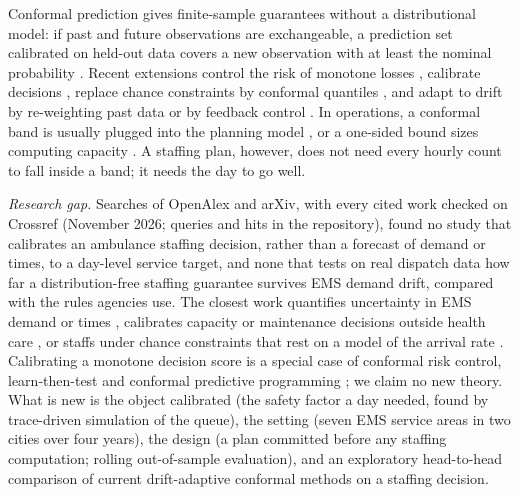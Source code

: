 \documentclass[11pt]{article}
\begin{document}
Conformal prediction gives finite-sample guarantees without a distributional model: if past and future observations are exchangeable, a prediction set calibrated on held-out data covers a new observation with at least the nominal probability \citep{vovk2022algorithmic,lei2018distribution,angelopoulos2023gentle}. Recent extensions control the risk of monotone losses \citep{angelopoulos2024conformal,angelopoulos2025learn}, calibrate decisions \citep{lekeufack2024conformal,alallawi2026decision}, replace chance constraints by conformal quantiles \citep{zhao2024conformal}, and adapt to drift by re-weighting past data \citep{barber2023beyond,tibshirani2019conformal} or by feedback control \citep{gibbs2021adaptive,angelopoulos2023pid}. In operations, a conformal band is usually plugged into the planning model \citep{makhado2026conformal}, or a one-sided bound sizes computing capacity \citep{ke2026rightsizing}. A staffing plan, however, does not need every hourly count to fall inside a band; it needs the day to go well.

\emph{Research gap.} Searches of OpenAlex and arXiv, with every cited work checked on Crossref (November 2026; queries and hits in the repository), found no study that calibrates an ambulance staffing decision, rather than a forecast of demand or times, to a day-level service target, and none that tests on real dispatch data how far a distribution-free staffing guarantee survives EMS demand drift, compared with the rules agencies use. The closest work quantifies uncertainty in EMS demand or times \citep{monks2023forecasting,rostamitabar2024hierarchical,kara2026beyond,mappouras2026process}, calibrates capacity or maintenance decisions outside health care \citep{ke2026rightsizing,alallawi2026decision}, or staffs under chance constraints that rest on a model of the arrival rate \citep{gurvich2010staffing}. Calibrating a monotone decision score is a special case of conformal risk control, learn-then-test and conformal predictive programming \citep{angelopoulos2024conformal,angelopoulos2025learn,zhao2024conformal}; we claim no new theory. What is new is the object calibrated (the safety factor a day needed, found by trace-driven simulation of the queue), the setting (seven EMS service areas in two cities over four years), the design (a plan committed before any staffing computation; rolling out-of-sample evaluation), and an exploratory head-to-head comparison of current drift-adaptive conformal methods on a staffing decision.
\end{document}
